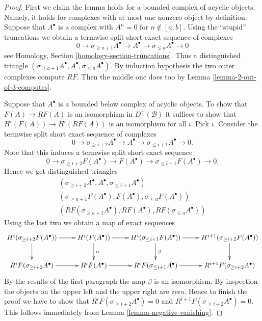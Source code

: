 \begin{proof}
First we claim the lemma holds for a bounded complex of acyclic objects.
Namely, it holds for complexes with at most one nonzero object by definition.
Suppose that $A^\bullet$ is a complex with $A^n = 0$ for
$n \not \in [a, b]$. Using the ``stupid'' truncations we obtain
a termwise split short exact sequence of complexes
$$
0 \to \sigma_{\geq a + 1} A^\bullet \to A^\bullet \to
\sigma_{\leq a} A^\bullet \to 0
$$
see
Homology, Section \ref{homology-section-truncations}.
Thus a distinguished triangle
$(\sigma_{\geq a + 1} A^\bullet, A^\bullet, \sigma_{\leq a} A^\bullet)$.
By induction hypothesis the two outer complexes compute $RF$.
Then the middle one does too by
Lemma \ref{lemma-2-out-of-3-computes}.

\medskip\noindent
Suppose that $A^\bullet$ is a bounded below complex of acyclic objects.
To show that $F(A) \to RF(A)$ is an isomorphism in $D^{+}(\mathcal{B})$
it suffices to show that $H^i(F(A)) \to H^i(RF(A))$ is an isomorphism for
all $i$. Pick $i$. Consider the termwise split short exact sequence of
complexes
$$
0 \to \sigma_{\geq i + 2} A^\bullet \to A^\bullet \to
\sigma_{\leq i + 1} A^\bullet \to 0.
$$
Note that this induces a termwise split short exact sequence
$$
0 \to \sigma_{\geq i + 2} F(A^\bullet) \to F(A^\bullet) \to
\sigma_{\leq i + 1} F(A^\bullet) \to 0.
$$
Hence we get distinguished triangles
$$
\begin{matrix}
(\sigma_{\geq i + 2} A^\bullet, A^\bullet,
\sigma_{\leq i + 1} A^\bullet) \\
(\sigma_{\geq a + 1} F(A^\bullet), F(A^\bullet),
\sigma_{\leq a} F(A^\bullet)) \\
(RF(\sigma_{\geq a + 1} A^\bullet), RF(A^\bullet),
RF(\sigma_{\leq a} A^\bullet))
\end{matrix}
$$
Using the last two we obtain a map of exact sequences
$$
\xymatrix{
H^i(\sigma_{\geq i + 2} F(A^\bullet)) \ar[r] \ar[d] &
H^i(F(A^\bullet)) \ar[r] \ar[d]^\alpha &
H^i(\sigma_{\leq i + 1} F(A^\bullet)) \ar[r] \ar[d]^\beta &
H^{i + 1}(\sigma_{\geq i + 2} F(A^\bullet)) \ar[d] \\
R^iF(\sigma_{\geq i + 2} A^\bullet) \ar[r] &
R^iF(A^\bullet) \ar[r] &
R^iF(\sigma_{\leq i + 1} A^\bullet) \ar[r] &
R^{i + 1}F(\sigma_{\geq i + 2} A^\bullet)
}
$$
By the results of the first paragraph the map $\beta$ is an isomorphism.
By inspection the objects on the upper left and the upper right
are zero. Hence to finish the proof we have to show that
$R^iF(\sigma_{\geq i + 2} A^\bullet) = 0$ and
$R^{i + 1}F(\sigma_{\geq i + 2} A^\bullet) = 0$.
This follows immediately from
Lemma \ref{lemma-negative-vanishing}.
\end{proof}

